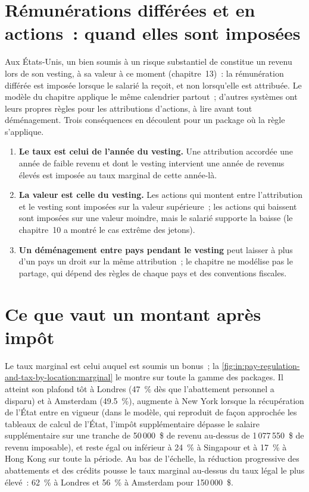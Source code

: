 \section{Rémunérations différées et en actions~: quand elles sont imposées}

Aux États-Unis, un bien soumis à un risque substantiel de  constitue un revenu lors de son vesting, à sa valeur à ce moment
(chapitre~13)~: la rémunération différée est imposée lorsque le salarié la reçoit, et non lorsqu'elle est attribuée. Le modèle du chapitre applique le
même calendrier partout~; d'autres systèmes ont leurs propres règles pour les attributions d'actions, à lire avant tout déménagement. Trois
conséquences en découlent pour un package où la règle s'applique.
\begin{enumerate}
\item \textbf{Le taux est celui de l'année du vesting.} Une attribution accordée une année de faible revenu et dont le vesting intervient une année de
revenus élevés est imposée au taux marginal de cette année-là.
\item \textbf{La valeur est celle du vesting.} Les actions qui montent entre l'attribution et le vesting sont imposées sur la valeur supérieure~;
les actions qui baissent sont imposées sur une valeur moindre, mais le salarié supporte la baisse (le chapitre~10 a montré le cas extrême des jetons).
\item \textbf{Un déménagement entre pays pendant le vesting} peut laisser à plus d'un pays un droit sur la même attribution~;
le chapitre ne modélise pas le partage, qui dépend des règles de chaque pays et des conventions fiscales.
\end{enumerate}

\section{Ce que vaut un montant après impôt}

Le taux marginal est celui auquel est soumis un bonus~; la \cref{fig:in:pay-regulation-and-tax-by-location:marginal} le montre sur toute la
gamme des packages. Il atteint son plafond tôt à Londres (47~\% dès que l'abattement personnel a disparu) et à Amsterdam
(49.5~\%), augmente à New York lorsque la récupération de l'État entre en vigueur (dans le modèle, qui reproduit de façon approchée les tableaux de calcul de l'État,
l'impôt supplémentaire dépasse le salaire supplémentaire sur une tranche de 50\,000~\$ de revenu au-dessus de 1\,077\,550~\$ de revenu imposable), et reste égal ou inférieur à 24~\% à Singapour et à 17~\% à
Hong Kong sur toute la période. Au bas de l'échelle, la réduction progressive des abattements et des crédits pousse le taux marginal au-dessus du
taux légal le plus élevé~: 62~\% à Londres et 56~\% à Amsterdam pour 150\,000~\$.

